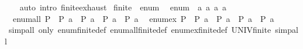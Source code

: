 \begin{isabellebody}
%
\isadelimproof
\ \ %
\endisadelimproof
%
\isatagproof
{}\isamarkupfalse%
\ {\isacharparenleft}{\kern0pt}auto\ intro{\isacharcolon}{\kern0pt}\ finite{\isacharunderscore}{\kern0pt}{}{\isachardot}{\kern0pt}exhaust{\isacharparenright}{\kern0pt}%
\endisatagproof
{\isafoldproof}%
%
\isadelimproof
\isanewline
%
\endisadelimproof
\isanewline
{}\isamarkupfalse%
\ finite{\isacharunderscore}{\kern0pt}{}\ {\isacharcolon}{\kern0pt}{\isacharcolon}{\kern0pt}\ enum\isanewline
{}\isanewline
\isanewline
{}\isamarkupfalse%
\isanewline
\ \ {\isachardoublequoteopen}enum\ {\isacharequal}{\kern0pt}\ {\isacharbrackleft}{\kern0pt}a\ a\ a\ a\isanewline
\isanewline
{}\isamarkupfalse%
\isanewline
\ \ {\isachardoublequoteopen}enum{\isacharunderscore}{\kern0pt}all\ P\ {\isasymlongleftrightarrow}\ P\ a\ {\isasymand}\ P\ a\ {\isasymand}\ P\ a\ {\isasymand}\ P\ a\isanewline
\isanewline
{}\isamarkupfalse%
\isanewline
\ \ {\isachardoublequoteopen}enum{\isacharunderscore}{\kern0pt}ex\ P\ {\isasymlongleftrightarrow}\ P\ a\ {\isasymor}\ P\ a\ {\isasymor}\ P\ a\ {\isasymor}\ P\ a\isanewline
\isanewline
{}\isamarkupfalse%
%
\isadelimproof
\ %
\endisadelimproof
%
\isatagproof
{}\isamarkupfalse%
\isanewline
{}\isamarkupfalse%
\ {\isacharparenleft}{\kern0pt}simp{\isacharunderscore}{\kern0pt}all\ only{\isacharcolon}{\kern0pt}\ enum{\isacharunderscore}{\kern0pt}finite{\isacharunderscore}{\kern0pt}{}{\isacharunderscore}{\kern0pt}def\ enum{\isacharunderscore}{\kern0pt}all{\isacharunderscore}{\kern0pt}finite{\isacharunderscore}{\kern0pt}{}{\isacharunderscore}{\kern0pt}def\ enum{\isacharunderscore}{\kern0pt}ex{\isacharunderscore}{\kern0pt}finite{\isacharunderscore}{\kern0pt}{}{\isacharunderscore}{\kern0pt}def\ UNIV{\isacharunderscore}{\kern0pt}finite{\isacharunderscore}{\kern0pt}{}{\isacharcomma}{\kern0pt}\ simp{\isacharunderscore}{\kern0pt}all{\isacharparenright}{\kern0pt}%
\endisatagproof

\end{isabellebody}
